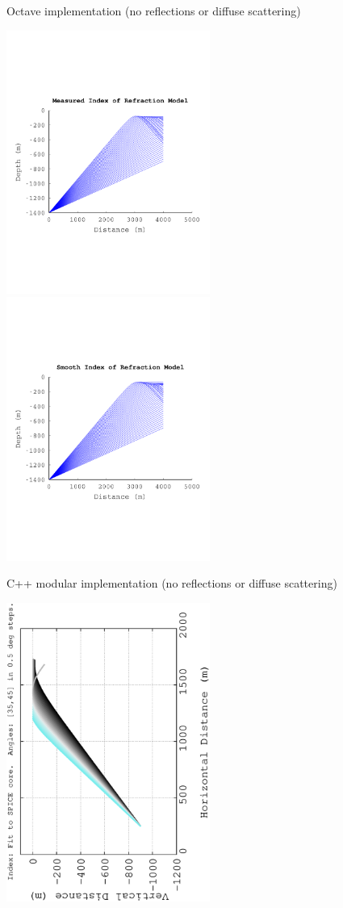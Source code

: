 \documentclass{beamer}
\begin{document}
\begin{frame}{Octave implementation (no reflections or diffuse scattering)}
\begin{center}
\includegraphics[width=0.5\textwidth]{figures/April28_plot5.pdf}
\includegraphics[width=0.5\textwidth]{figures/April28_plot6.pdf}
\end{center}
\end{frame}

\begin{frame}{C++ modular implementation (no reflections or diffuse scattering)}
\begin{center}
\includegraphics[width=0.5\textwidth,angle=270]{figures/May11_plot1.eps}
\end{center}
\end{frame}
\end{document}
